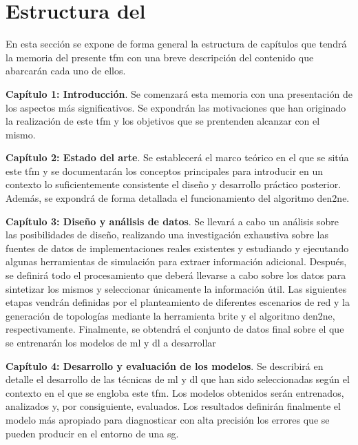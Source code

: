 \section{Estructura del }
\label{sec:structure}

En esta sección se expone de forma general la estructura de capítulos que tendrá la memoria del presente \gls{tfm} con una breve descripción del contenido que abarcarán cada uno de ellos.

\begin{description}
    \item\textbf{Capítulo 1: Introducción}. Se comenzará esta memoria con una presentación de los aspectos más significativos. Se expondrán las motivaciones que han originado la realización de este \gls{tfm} y los objetivos que se prentenden alcanzar con el mismo.

    \item\textbf{Capítulo 2: Estado del arte}. Se establecerá el marco teórico en el que se sitúa este \gls{tfm} y se documentarán los conceptos principales para introducir en un contexto lo suficientemente consistente el diseño y desarrollo práctico posterior. Además, se expondrá de forma detallada el funcionamiento del algoritmo \gls{den2ne}.

    \item\textbf{Capítulo 3: Diseño y análisis de datos}. Se llevará a cabo un análisis sobre las posibilidades de diseño, realizando una investigación exhaustiva sobre las fuentes de datos de implementaciones reales existentes y estudiando y ejecutando algunas herramientas de simulación para extraer información adicional. Después, se definirá todo el procesamiento que deberá llevarse a cabo sobre los datos para sintetizar los mismos y seleccionar únicamente la información útil. Las siguientes etapas vendrán definidas por el planteamiento de diferentes escenarios de red y la generación de topologías mediante la herramienta \gls{brite} y el algoritmo \gls{den2ne}, respectivamente. Finalmente, se obtendrá el conjunto de datos final sobre el que se entrenarán los modelos de \gls{ml} y \gls{dl} a desarrollar  

    \item\textbf{Capítulo 4: Desarrollo y evaluación de los modelos}. Se describirá en detalle el desarrollo de las técnicas de \gls{ml} y \gls{dl} que han sido seleccionadas según el contexto en el que se engloba este \gls{tfm}. Los modelos obtenidos serán entrenados, analizados y, por consiguiente, evaluados. Los resultados definirán finalmente el modelo más apropiado para diagnosticar con alta precisión los errores que se pueden producir en el entorno de una \gls{sg}.
    

\end{description}
